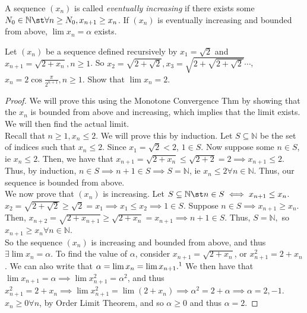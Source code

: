 \documentclass[12pt]{article}
\begin{document}
\begin{example}
  A sequence $(x_n)$ is called \emph{eventually increasing} if there exists some $N_0 \in \mathbb{N} \st \forall n \geq N_0, x_{n+1} \geq x_n$. If $(x_n)$ is eventually increasing and bounded from above, $\lim x_n = \alpha$ exists.
\end{example}

\begin{example}
  Let $(x_n)$ be a sequence defined recursively by $x_1 = \sqrt{2}$ and $x_{n+1} = \sqrt{2 + x_n}, n \geq 1$. So $x_2 = \sqrt{2 + \sqrt{2}}, x_3 = \sqrt{2 + \sqrt{2 + \sqrt{2}}} \cdots$, $x_n = 2 \cos \frac{\pi}{2^{n+1}}, n \geq 1$. Show that $\lim x_n = 2$.
  \begin{proof}
    We will prove this using the Monotone Convergence Thm by showing that the $x_n$ is bounded from above and increasing, which implies that the limit exists. We will then find the actual limit.\\
    Recall that $n \geq 1, x_n \leq 2$. We will prove this by induction. Let $S \subseteq \mathbb{N}$ be the set of indices such that $x_n \leq 2$. Since $x_1 = \sqrt{2} < 2$, $1 \in S$. Now suppose some $n \in S$, ie $x_n \leq 2$. Then, we have that $x_{n+1} = \sqrt{2 + x_n} \leq \sqrt{2+2} = 2 \implies x_{n+1} \leq 2$. Thus, by induction, $n \in S \implies n+1 \in S \implies S = \mathbb{N}$, ie $x_{n} \leq 2 \forall n \in \mathbb{N}$. Thus, our sequence is bounded from above.\\
    We now prove that $(x_n)$ is increasing. Let $S \subseteq \mathbb{N} \st n \in S \iff x_{n+1} \leq x_n$. $x_2 = \sqrt{2 + \sqrt{2}} \geq \sqrt{2} = x_1 \implies x_1 \leq x_2 \implies 1 \in S$. Suppose $n \in S \implies x_{n+1} \geq x_n$. Then, $x_{n+2} = \sqrt{2 + x_{n+1}} \geq \sqrt{2 + x_n} = x_{n+1} \implies n+1 \in S$. Thus, $S = \mathbb{N}, $ so $x_{n+1} \geq x_{n} \forall n \in \mathbb{N}$.\\
    So the sequence $(x_n)$ is increasing and bounded from above, and thus $\exists \lim x_n = \alpha$. To find the value of $\alpha$, consider $x_{n+1} = \sqrt{2 + x_n}$, or $x_{n+1}^2 = 2 + x_n$. We can also write that $\alpha = \lim x_n = \lim x_{n+1}.\footnotemark$ We then have that $\lim x_{n+1} = \alpha \implies \lim x_{n+1}^2 = \alpha^2$, and thus $x_{n+1}^2 = 2+ x_n \implies \lim  x_{n+1}^2 = \lim (2+x_n) \implies \alpha^2 = 2 + \alpha  \implies \alpha = 2, -1$. $x_n \geq 0 \forall n$, by Order Limit Theorem, and so $\alpha \geq 0$ and thus $\alpha = 2$.
  \end{proof}
\end{example}
\end{document}
